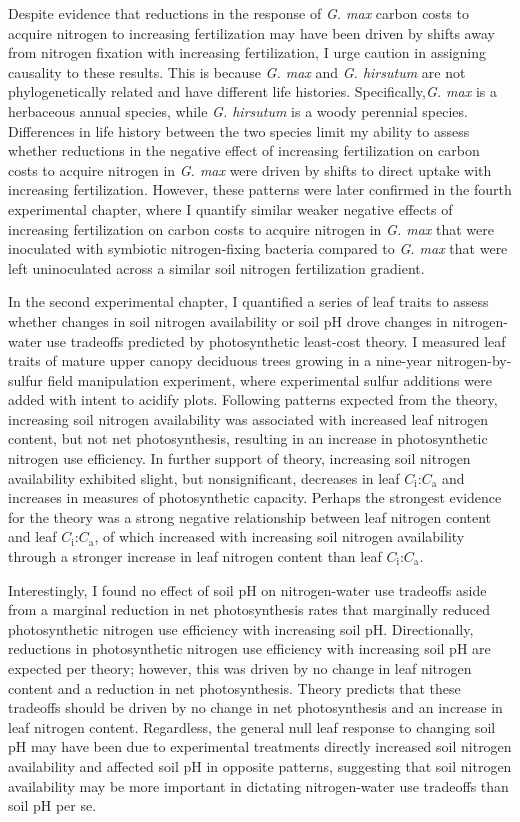 Despite evidence that reductions in the response of \textit{G. max} carbon costs to acquire nitrogen to increasing fertilization may have been driven by shifts away from nitrogen fixation with increasing fertilization, I urge caution in assigning causality to these results. This is because \textit{G. max} and \textit{G. hirsutum} are not phylogenetically related and have different life histories. Specifically,\textit{G. max} is a herbaceous annual species, while \textit{G. hirsutum} is a woody perennial species. Differences in life history between the two species limit my ability to assess whether reductions in the negative effect of increasing fertilization on carbon costs to acquire nitrogen in \textit{G. max} were driven by shifts to direct uptake with increasing fertilization. However, these patterns were later confirmed in the fourth experimental chapter, where I quantify similar weaker negative effects of increasing fertilization on carbon costs to acquire nitrogen in \textit{G. max} that were inoculated with symbiotic nitrogen-fixing bacteria compared to \textit{G. max} that were left uninoculated across a similar soil nitrogen fertilization gradient.

In the second experimental chapter, I quantified a series of leaf traits to assess whether changes in soil nitrogen availability or soil pH drove changes in nitrogen-water use tradeoffs predicted by photosynthetic least-cost theory. I measured leaf traits of mature upper canopy deciduous trees growing in a nine-year nitrogen-by-sulfur field manipulation experiment, where experimental sulfur additions were added with intent to acidify plots. Following patterns expected from the theory, increasing soil nitrogen availability was associated with increased leaf nitrogen content, but not net photosynthesis, resulting in an increase in photosynthetic nitrogen use efficiency. In further support of theory, increasing soil nitrogen availability exhibited slight, but nonsignificant, decreases in leaf $C_\mathrm{i}$:$C_\mathrm{a}$ and increases in measures of photosynthetic capacity. Perhaps the strongest evidence for the theory was a strong negative relationship between leaf nitrogen content and leaf $C_\mathrm{i}$:$C_\mathrm{a}$, of which increased with increasing soil nitrogen availability through a stronger increase in leaf nitrogen content than leaf $C_\mathrm{i}$:$C_\mathrm{a}$.

Interestingly, I found no effect of soil pH on nitrogen-water use tradeoffs aside from a marginal reduction in net photosynthesis rates that marginally reduced photosynthetic nitrogen use efficiency with increasing soil pH. Directionally, reductions in photosynthetic nitrogen use efficiency with increasing soil pH are expected per theory; however, this was driven by no change in leaf nitrogen content and a reduction in net photosynthesis. Theory predicts that these tradeoffs should be driven by no change in net photosynthesis and an increase in leaf nitrogen content. Regardless, the general null leaf response to changing soil pH may have been due to experimental treatments directly increased soil nitrogen availability and affected soil pH in opposite patterns, suggesting that soil nitrogen availability may be more important in dictating nitrogen-water use tradeoffs than soil pH per se.

